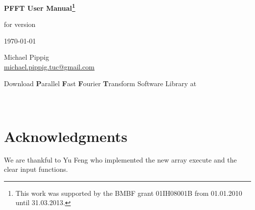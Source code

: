\documentclass[a4paper,11pt,final,openright,headsepline]{scrreprt}
\numberwithin{figure}{chapter}
\numberwithin{table}{chapter}
\numberwithin{equation}{chapter}
\begin{document}
  \setcounter{equation}{0}
  \begin{titlepage}
    \begin{center}
      \vspace*{3cm}
      {\Huge {\textbf{\textsf{PFFT User Manual\footnote{This work was supported by the BMBF grant 01IH08001B from 01.01.2010 until 31.03.2013.}\\}}}}

      \vspace*{0.5cm}
      for version \pfftversion

      \vspace*{1cm}
      \today
      
      \vspace*{3cm}
        Michael Pippig\\
        \href{mailto:michael.pippig.tuc@gmail.com}{michael.pippig.tuc@gmail.com}

    \vspace*{3cm}
      Download \textbf{\Large P}arallel \textbf{\Large F}ast \textbf{\Large F}ourier \textbf{\Large T}ransform Software Library at \\
      {\large \websoft}\\
      {\large \webpfft}\\
    \end{center}
  \end{titlepage}

  \listoftodos
  \tableofcontents
 



  \section*{Acknowledgments}
  We are thankful to Yu Feng who implemented the new array execute and the clear input functions.

  
  
\end{document}

